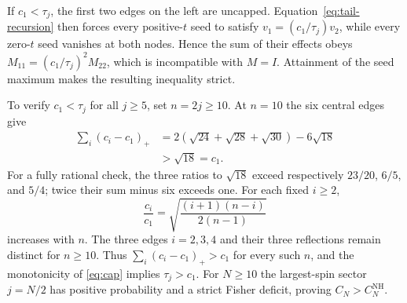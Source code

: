 \documentclass[aps,pra,reprint,superscriptaddress,longbibliography]{revtex4-2}
\theoremstyle{remark}
\newcommand{\nh}{\mathrm{NH}}
\begin{document}
If $c_1<\tau_j$, the first two edges on the left are uncapped.
Equation~\eqref{eq:tail-recursion} then forces every positive-$t$
seed to satisfy $v_1=(c_1/\tau_j)v_2$, while every zero-$t$ seed
vanishes at both nodes. Hence the sum of their effects obeys
$M_{11}=(c_1/\tau_j)^2M_{22}$, which is incompatible with
$M=I$. Attainment of the seed maximum makes the resulting
inequality strict.

To verify $c_1<\tau_j$ for all $j\geq5$, set $n=2j\geq10$.
At $n=10$ the six central edges give
\begin{align*}
 \sum_i(c_i-c_1)_+
 &=2(\sqrt{24}+\sqrt{28}+\sqrt{30})-6\sqrt{18}\\
 &>\sqrt{18}=c_1.
\end{align*}
For a fully rational check, the three ratios to $\sqrt{18}$
exceed respectively $23/20$, $6/5$, and $5/4$; twice their
sum minus six exceeds one. For each fixed $i\geq2$,
\[
 \frac{c_i}{c_1}=
 \sqrt{\frac{(i+1)(n-i)}{2(n-1)}}
\]
increases with $n$. The three edges $i=2,3,4$ and their three
reflections remain distinct for $n\geq10$. Thus
$\sum_i(c_i-c_1)_+>c_1$ for every such $n$, and the monotonicity
of \eqref{eq:cap} implies $\tau_j>c_1$.
For $N\geq10$ the largest-spin sector $j=N/2$ has positive
probability and a strict Fisher deficit, proving
$C_N>C_N^{\nh}$.


\end{document}
